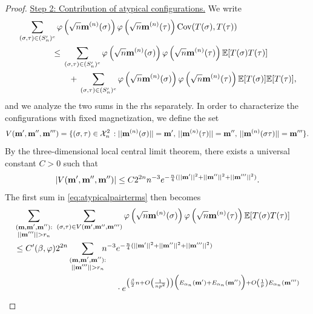 \documentclass[11pt,oneside]{amsart}
\numberwithin{equation}{section}  %
\theoremstyle{plain}
\theoremstyle{remark}
\def \E {{\mathbb E}}
\def \bm {{\bf m}}
\begin{document}
\begin{proof}
\noindent
\underline{Step 2: Contribution of atypical configurations.} 
We write
\begin{equation}
\label{eq:atypicalpairterms}
\begin{split}
& \sum_{(\sigma, \tau) \in (S'_n)^c} \varphi\left(\sqrt{n} \bm^{(n)}(\sigma) \right) \varphi\left(\sqrt{n} \bm^{(n)}(\tau) \right) {\rm Cov}(T(\sigma), T(\tau))  \\
&\qquad \qquad \leq \, \sum_{(\sigma, \tau) \in (S'_n)^c} \varphi\left(\sqrt{n} \bm^{(n)}(\sigma) \right) \varphi\left(\sqrt{n} \bm^{(n)}(\tau) \right) \E[T(\sigma) T(\tau)] \\
& \qquad \qquad  \qquad + \, \sum_{(\sigma, \tau) \in(S'_n)^c} \varphi\left(\sqrt{n} \bm^{(n)}(\sigma) \right) \varphi\left(\sqrt{n} \bm^{(n)}(\tau) \right) \E[T(\sigma)] \E[T(\tau)],
\end{split}
\end{equation}
and we analyze the two sums in the rhs separately. In order to characterize the configurations with fixed magnetization, we define the set
\begin{equation*}V(\bm',\bm'',\bm''')= \{(\sigma,\tau) \in \mathcal{X}_n^2\, : ||\bm^{(n)}(\sigma)||=\bm', \, ||\bm^{(n)}(\tau)||=\bm'',\, ||\bm^{(n)}(\sigma\tau)||=\bm'''\}.
\end{equation*}
By the three-dimensional local central limit theorem, there exists a universal constant $C>0$
such that
\begin{align*}
    |V(\bm',\bm'',\bm'')| \leq C2^{2n}n^{-3}e^{-\frac{n}{4}(||\bm'||^2+||\bm''||^2+||\bm'''||^2)}.
\end{align*}
The first sum in \eqref{eq:atypicalpairterms} then becomes
\begin{equation} \label{eq:atypicalpairfirst}
\begin{split}
&\sum_{\substack{(\bm,\bm',\bm'') : \\ || \bm'''||>r_n}} \,\,\sum_{(\sigma, \tau) \in V(\bm',\bm'',\bm''')} \varphi\left(\sqrt{n} \bm^{(n)}(\sigma) \right) \varphi\left(\sqrt{n} \bm^{(n)}(\tau) \right)\E[T(\sigma) T(\tau)] \\
&\leq C'(\beta,\varphi)2^{2n} \sum_{\substack{(\bm,\bm',\bm''): 
\\ || \bm'''||>r_n}} \!\!\!\! n^{-3}  e^{-\frac{n}{4}(||\bm'||^2+||\bm''||^2+||\bm'''||^2)} \\
& \qquad \qquad \qquad \qquad \qquad \qquad\cdot e^{
 \left(\frac{\beta}{2}n+O\left(\frac{1}{np^2}\right)\right)
\Big( E_{\alpha_n} (\bm') +E_{\alpha_n} (\bm'') \Big)
 + O\left(\frac{1}{p}\right) E_{\alpha_n} (\bm''')}  \\

\end{split}
\end{equation}
\end{proof}
\end{document}
